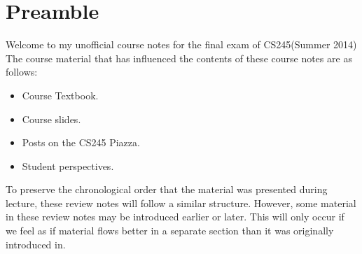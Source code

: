 \section*{Preamble}

Welcome to my unofficial course notes for the final exam of CS245(Summer 2014)\\

The course material that has influenced the contents of these course notes are as follows:

\begin{itemize}

\item Course Textbook.
\item Course slides.
\item Posts on the CS245 Piazza.
\item Student perspectives.

\end{itemize}

To preserve the chronological order that the material was presented during lecture, these review notes will follow a similar structure. However, some material in these review notes may be introduced earlier or later. This will only occur if we feel as if material flows better in a separate section than it was originally introduced in.\\
